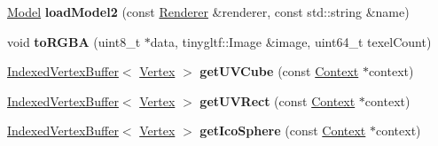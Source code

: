\begin{DoxyCompactItemize}
\item 
\mbox{\label{namespaceblaze_a630888b7c86cb756724d004a91cda8b2}} 
\hyperlink{classblaze_1_1Model}{Model} {\bfseries load\+Model2} (const \hyperlink{classblaze_1_1Renderer}{Renderer} \&renderer, const std\+::string \&name)
\item 
\mbox{\label{namespaceblaze_a174ec85e4f8fcf5a02ebb0e46afd7aaf}} 
void {\bfseries to\+R\+G\+BA} (uint8\+\_\+t $\ast$data, tinygltf\+::\+Image \&image, uint64\+\_\+t texel\+Count)
\item 
\mbox{\label{namespaceblaze_adc603baa5ef6108a92825626b3ac6da1}} 
\hyperlink{classblaze_1_1IndexedVertexBuffer}{Indexed\+Vertex\+Buffer}$<$ \hyperlink{structblaze_1_1Vertex}{Vertex} $>$ {\bfseries get\+U\+V\+Cube} (const \hyperlink{classblaze_1_1Context}{Context} $\ast$context)
\item 
\mbox{\label{namespaceblaze_a23417e50bcc487bd1ad92c3379e150d9}} 
\hyperlink{classblaze_1_1IndexedVertexBuffer}{Indexed\+Vertex\+Buffer}$<$ \hyperlink{structblaze_1_1Vertex}{Vertex} $>$ {\bfseries get\+U\+V\+Rect} (const \hyperlink{classblaze_1_1Context}{Context} $\ast$context)
\item 
\mbox{\label{namespaceblaze_a2d310f85a419df431ebcb9ca077c303c}} 
\hyperlink{classblaze_1_1IndexedVertexBuffer}{Indexed\+Vertex\+Buffer}$<$ \hyperlink{structblaze_1_1Vertex}{Vertex} $>$ {\bfseries get\+Ico\+Sphere} (const \hyperlink{classblaze_1_1Context}{Context} $\ast$context)
\end{DoxyCompactItemize}

